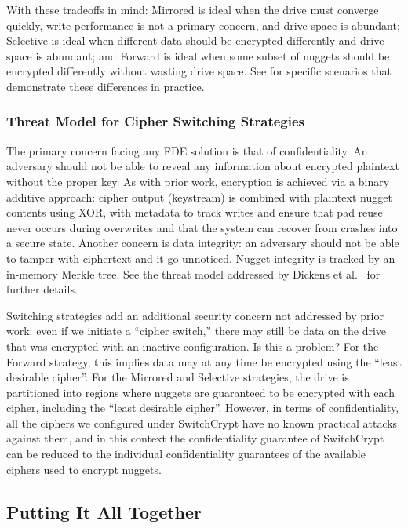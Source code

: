 With these tradeoffs in mind: Mirrored is ideal when the drive must converge
quickly, write performance is not a primary concern, and drive space is
abundant; Selective is ideal when different data should be encrypted differently
and drive space is abundant; and Forward is ideal when some subset of nuggets
should be encrypted differently without wasting drive space. See
 for specific scenarios that demonstrate these differences in
practice.

\subsubsection{Threat Model for Cipher Switching Strategies}

The primary concern facing any FDE solution is that of confidentiality. An
adversary should not be able to reveal any information about encrypted plaintext
without the proper key. As with prior work, encryption is achieved via a binary
additive approach: cipher output (keystream) is combined with plaintext nugget
contents using XOR, with metadata to track writes and ensure that pad reuse
never occurs during overwrites and that the system can recover from crashes into
a secure state. Another concern is data integrity: an adversary should not be
able to tamper with ciphertext and it go unnoticed. Nugget integrity is tracked
by an in-memory Merkle tree. See the threat model addressed by Dickens et
al.~\cite{StrongBox} for further details.

Switching strategies add an additional security concern not addressed by prior
work: even if we initiate a ``cipher switch,'' there may still be data on the
drive that was encrypted with an inactive configuration. Is this a problem? For
the Forward strategy, this implies data may at any time be encrypted using the
``least desirable cipher''. For the Mirrored and Selective strategies, the drive
is partitioned into regions where nuggets are guaranteed to be encrypted with
each cipher, including the ``least desirable cipher''. However, in terms of
confidentiality, all the ciphers we configured under SwitchCrypt have no known
practical attacks against them, and in this context the confidentiality
guarantee of SwitchCrypt can be reduced to the individual confidentiality
guarantees of the available ciphers used to encrypt nuggets.

\subsection{Putting It All Together} \label{subsec:summary}

